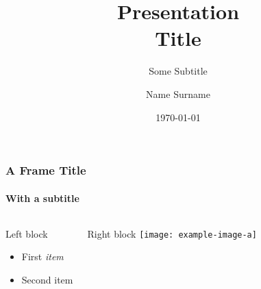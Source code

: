 \documentclass[10pt,t]{beamer}
\title{Presentation\\Title}
\subtitle{Some Subtitle}
\author[N. Surname]{Name Surname}
\institute[ShortConf]{Conference Name}
\date[\today]{\today}
\begin{document}
\maketitle

\begin{frame}
	\frametitle{A Frame Title}
	\framesubtitle{With a subtitle}
    \begin{columns}[onlytextwidth]
        \begin{block}{Left block}
        \begin{itemize}
            \item First \emph<1>{item}
            \item Second \alert<2>{item}
        \end{itemize}
        \end{block}
        \begin{block}{Right block}
            \texttt{[image: example-image-a]}
        \end{block}
    \end{columns}
\end{frame}
\end{document}
